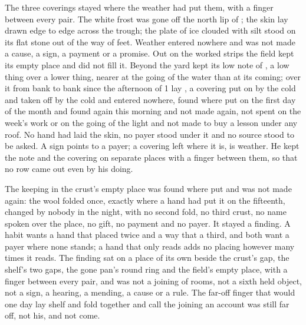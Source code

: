 The three coverings stayed where the weather had put them, with a finger between every pair. The white frost was gone off the north lip of ; the skin lay drawn edge to edge across the trough; the plate of ice clouded with silt stood on its flat stone out of the way of feet. Weather entered nowhere and was not made a cause, a sign, a payment or a promise. Out on the worked strips the field kept its empty place and did not fill it. Beyond the yard  kept its low note of , a low thing over a lower thing, nearer at the going of the water than at its coming; over it from bank to bank since the afternoon of  1 lay , a covering put on by the cold and taken off by the cold and entered nowhere, found where put on the first day of the month and found again this morning and not made again, not spent on the week's work or on the going of the light and not made to buy a lesson under any roof. No hand had laid the skin, no payer stood under it and no source stood to be asked. A sign points to a payer; a covering left where it is, is weather. He kept the note and the covering on separate places with a finger between them, so that no row came out even by his doing.

\scenebreak

The keeping in the crust's empty place was found where put and was not made again: the wool folded once, exactly where a hand had put it on the fifteenth, changed by nobody in the night, with no second fold, no third crust, no name spoken over the place, no gift, no payment and no payer. It stayed a finding. A habit wants a hand that placed twice and a way that a third, and both want a payer where none stands; a hand that only reads adds no placing however many times it reads. The finding sat on a place of its own beside the crust's gap, the shelf's two gaps, the gone pan's round ring and the field's empty place, with a finger between every pair, and was not a joining of rooms, not a sixth held object, not a sign, a hearing, a mending, a cause or a rule. The far-off finger that would one day lay shelf and fold together and call the joining an account was still far off, not his, and not come.

